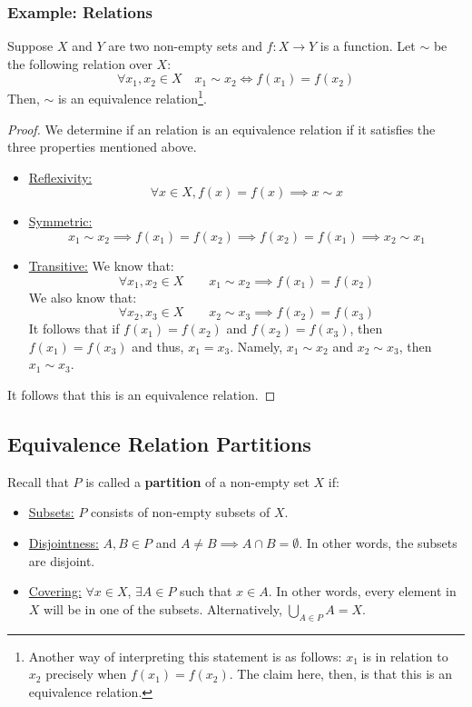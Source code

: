 \documentclass[letterpaper]{article}
\begin{document}
\subsubsection{Example: Relations}
Suppose $X$ and $Y$ are two non-empty sets and $f: X \to Y$ is a function. Let $\sim$ be the following relation over $X$:
\[\forall x_1, x_2 \in X \quad x_1 \sim x_2 \iff f(x_1) = f(x_2)\]
Then, $\sim$ is an equivalence relation\footnote{Another way of interpreting this statement is as follows: $x_1$ is in relation to $x_2$ precisely when $f(x_1) = f(x_2)$. The claim here, then, is that this is an equivalence relation.}.

\begin{mdframed}
    \begin{proof}
        We determine if an relation is an equivalence relation if it satisfies the three properties mentioned above.
        \begin{itemize}
            \item \underline{Reflexivity:}
            \[\forall x \in X, f(x) = f(x) \implies x \sim x\]
    
            \item \underline{Symmetric:}
            \[x_1 \sim x_2 \implies f(x_1) = f(x_2) \implies f(x_2) = f(x_1) \implies x_2 \sim x_1\]
    
            \item \underline{Transitive:}
            We know that:
            \[\forall x_1, x_2 \in X \qquad x_1 \sim x_2 \implies f(x_1) = f(x_2)\]
            We also know that:
            \[\forall x_2, x_3 \in X \qquad x_2 \sim x_3 \implies f(x_2) = f(x_3)\]
            It follows that if $f(x_1) = f(x_2)$ and $f(x_2) = f(x_3)$, then $f(x_1) = f(x_3)$ and thus, $x_1 = x_3$. Namely, $x_1 \sim x_2$ and $x_2 \sim x_3$, then $x_1 \sim x_3$. 
        \end{itemize}
        It follows that this is an equivalence relation. 
    \end{proof}
\end{mdframed}

\subsection{Equivalence Relation Partitions}
Recall that $P$ is called a \textbf{partition} of a non-empty set $X$ if:
\begin{itemize}
    \item \underline{Subsets:} $P$ consists of non-empty subsets of $X$. 
    \item \underline{Disjointness:} $A, B \in P$ and $A \neq B \implies A \cap B = \emptyset$. In other words, the subsets are disjoint. 
    \item \underline{Covering:} $\forall x \in X$, $\exists A \in P$ such that $x \in A$. In other words, every element in $X$ will be in one of the subsets. Alternatively, $\bigcup_{A \in P} A = X$. 
\end{itemize}
\end{document}
